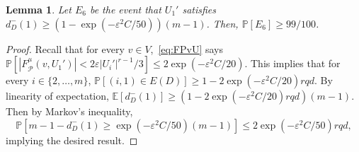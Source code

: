 \documentclass[11pt, letterpaper]{amsart}
\theoremstyle{plain}
\numberwithin{equation}{section}
\newtheorem{lemma}[thm]{Lemma}
\theoremstyle{definition}
\newcommand\card[1]{\left| #1 \right|}
\renewcommand{\vec}[1]{{\mathbf #1}}
\begin{document}
\begin{lemma}\label{U_1}
Let $E_6$ be the event that $U_1'$ satisfies $d_D^-(1)\ge (1-\exp{\left(-\varepsilon^2 C/50\right)})(m-1)$.%
Then, $\mathbb{P}\left[E_6\right]\ge 99/100$.
\end{lemma}
\begin{proof}
Recall that for every \(v\in V\),~\eqref{eq:FPvU} says $\mathbb{P}\left[|F^{\mu}_{\mathcal{P}}(v,U_1')|<2\varepsilon{\card{U_i'}}^{r-1}/3\right]\le 2\exp{\left(-\varepsilon^2 C/20\right)}$. 
This implies that for every \(i\in \{2,\dots,m\}\), \(\mathbb{P}\left[(i,1)\in E(D)\right]\ge 1-2\exp{\left(-\varepsilon^2 C/20\right)}rqd.\)
By linearity of expectation, \(\mathbb{E}\left[d_D^-(1)\right]\ge \left(1-2\exp{\left(-\varepsilon^2 C/20\right)}rqd\right)\left(m-1\right)\). 
Then by Markov's inequality, 
\[
\mathbb{P}\left[m-1-d_D^-(1)\ge \exp{\left(-\varepsilon^2 C/50\right)\left(m-1\right)}\right]\le 2\exp{\left(-\varepsilon^2 C/50\right)}rqd,
\] implying the desired result.
         \end{proof}
            
\end{document}
